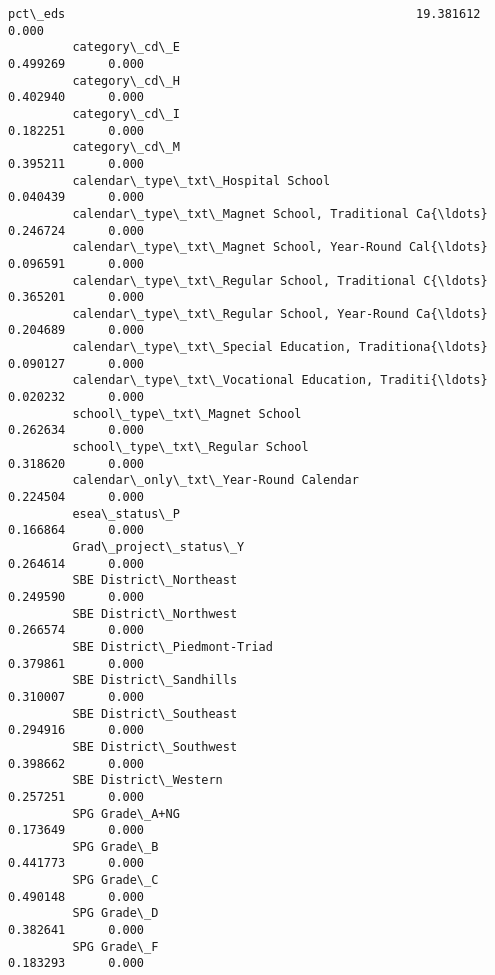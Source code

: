 \documentclass[11pt]{article}
\begin{document}
\begin{Verbatim}[commandchars=\\\{\}]
         pct\_eds                                                 19.381612      0.000   
         category\_cd\_E                                            0.499269      0.000   
         category\_cd\_H                                            0.402940      0.000   
         category\_cd\_I                                            0.182251      0.000   
         category\_cd\_M                                            0.395211      0.000   
         calendar\_type\_txt\_Hospital School                        0.040439      0.000   
         calendar\_type\_txt\_Magnet School, Traditional Ca{\ldots}       0.246724      0.000   
         calendar\_type\_txt\_Magnet School, Year-Round Cal{\ldots}       0.096591      0.000   
         calendar\_type\_txt\_Regular School, Traditional C{\ldots}       0.365201      0.000   
         calendar\_type\_txt\_Regular School, Year-Round Ca{\ldots}       0.204689      0.000   
         calendar\_type\_txt\_Special Education, Traditiona{\ldots}       0.090127      0.000   
         calendar\_type\_txt\_Vocational Education, Traditi{\ldots}       0.020232      0.000   
         school\_type\_txt\_Magnet School                            0.262634      0.000   
         school\_type\_txt\_Regular School                           0.318620      0.000   
         calendar\_only\_txt\_Year-Round Calendar                    0.224504      0.000   
         esea\_status\_P                                            0.166864      0.000   
         Grad\_project\_status\_Y                                    0.264614      0.000   
         SBE District\_Northeast                                   0.249590      0.000   
         SBE District\_Northwest                                   0.266574      0.000   
         SBE District\_Piedmont-Triad                              0.379861      0.000   
         SBE District\_Sandhills                                   0.310007      0.000   
         SBE District\_Southeast                                   0.294916      0.000   
         SBE District\_Southwest                                   0.398662      0.000   
         SBE District\_Western                                     0.257251      0.000   
         SPG Grade\_A+NG                                           0.173649      0.000   
         SPG Grade\_B                                              0.441773      0.000   
         SPG Grade\_C                                              0.490148      0.000   
         SPG Grade\_D                                              0.382641      0.000   
         SPG Grade\_F                                              0.183293      0.000   

\end{Verbatim}
\end{document}
